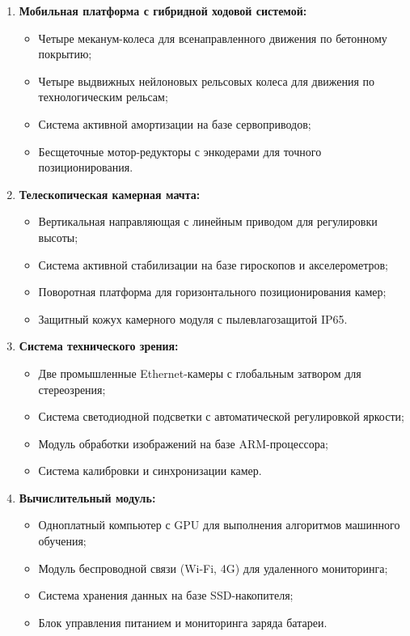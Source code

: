 \documentclass[12pt,a4paper]{article}
\begin{document}
\begin{enumerate}
\item \textbf{Мобильная платформа с гибридной ходовой системой:}
   \begin{itemize}
   \item Четыре меканум-колеса для всенаправленного движения по бетонному покрытию;
   \item Четыре выдвижных нейлоновых рельсовых колеса для движения по технологическим рельсам;
   \item Система активной амортизации на базе сервоприводов;
   \item Бесщеточные мотор-редукторы с энкодерами для точного позиционирования.
   \end{itemize}

\item \textbf{Телескопическая камерная мачта:}
   \begin{itemize}
   \item Вертикальная направляющая с линейным приводом для регулировки высоты;
   \item Система активной стабилизации на базе гироскопов и акселерометров;
   \item Поворотная платформа для горизонтального позиционирования камер;
   \item Защитный кожух камерного модуля с пылевлагозащитой IP65.
   \end{itemize}

\item \textbf{Система технического зрения:}
   \begin{itemize}
   \item Две промышленные Ethernet-камеры с глобальным затвором для стереозрения;
   \item Система светодиодной подсветки с автоматической регулировкой яркости;
   \item Модуль обработки изображений на базе ARM-процессора;
   \item Система калибровки и синхронизации камер.
   \end{itemize}

\item \textbf{Вычислительный модуль:}
   \begin{itemize}
   \item Одноплатный компьютер с GPU для выполнения алгоритмов машинного обучения;
   \item Модуль беспроводной связи (Wi-Fi, 4G) для удаленного мониторинга;
   \item Система хранения данных на базе SSD-накопителя;
   \item Блок управления питанием и мониторинга заряда батареи.
   \end{itemize}


\end{enumerate}
\end{document}

